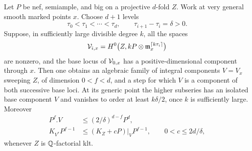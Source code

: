 \begin{lemma}\label{proj:jet:tracking}
Let \(P\) be nef, semiample, and big on a projective \(d\)-fold \(Z\).
Work at very general smooth marked points \(x\).  Choose \(d+1\)
levels
\[
 \tau_0<\tau_1<\cdots<\tau_d,\qquad
 \tau_{i+1}-\tau_i=\delta>0.
\]
Suppose, in sufficiently large divisible degree \(k\), all the spaces
\[
 {\cal V}_{i,x}
 =H^0\bigl(Z,kP\otimes\mathfrak m_x^{\lceil k\tau_i\rceil}\bigr)
\]
are nonzero, and the base locus of \({\cal V}_{0,x}\) has a
positive-dimensional component through \(x\).
Then one obtains an algebraic family of integral components \(V=V_x\)
sweeping \(Z\), of dimension \(0<f<d\), and a step for which \(V\)
is a component of both successive base loci.  At its generic point
the higher subseries has an isolated base component \(V\) and
vanishes to order at least \(k\delta/2\), once \(k\) is sufficiently
large.  Moreover
\begin{equation}\label{proj:jet:tracking-estimates}
 \begin{split}
  P^f.V&\le (2/\delta)^{d-f}P^d,\\
  K_{V^*}P^{f-1}
   &\le (K_Z+cP)|_V P^{f-1},
       \qquad 0<c\le 2d/\delta,
 \end{split}
\end{equation}
whenever \(Z\) is \(\mathbb{Q}\)-factorial klt.
\end{lemma}

